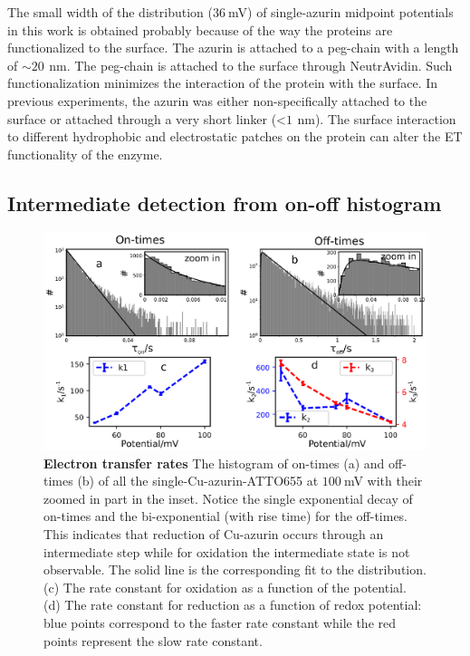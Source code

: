 \documentclass[journal=jacsat,manuscript=article]{achemso}
\newcommand{\nm}{\ensuremath{\,\textrm{nm}}}
\begin{document}
The small width of the distribution ($36~$mV) of single-azurin midpoint potentials in this work is obtained probably because of the way the proteins are functionalized to the surface. The azurin is attached to a peg-chain with a length of ${\sim}20~\nm$. The peg-chain is attached to the surface through NeutrAvidin. Such functionalization minimizes the interaction of the protein with the surface. In previous experiments, the azurin was either non-specifically attached to the surface or attached through a very short linker (<$1~\nm$). The surface interaction to different hydrophobic and electrostatic patches on the protein can alter the ET functionality of the enzyme.
\subsection{Intermediate detection from on-off histogram}
\begin{figure}
	\centering
	\includegraphics[width=\textwidth]{many_sm_hist.eps}
	\caption{\textbf{Electron transfer rates} The histogram of on-times (a) and off-times (b) of all the single-Cu-azurin-ATTO655 at $100~$mV with their zoomed in part in the inset. Notice the single exponential decay of on-times and the bi-exponential (with rise time) for the off-times. This indicates that  reduction of Cu-azurin occurs through an intermediate step while for oxidation the intermediate state is not observable. The solid line is the corresponding fit to the distribution. (c) The rate constant for oxidation as a function of the potential. (d) The rate constant for reduction as a function of redox potential: blue points correspond to the faster rate constant while the red points represent the slow rate constant.}
	\label{fig:many_sm_hist}
\end{figure}
\end{document}
